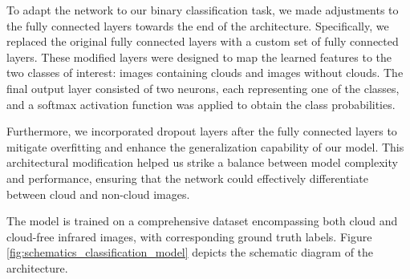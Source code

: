 \documentclass[amt, article]{copernicus}
\begin{document}
To adapt the network to our binary classification task, we made adjustments to the fully connected layers towards the end of the architecture. Specifically, we replaced the original fully connected layers with a custom set of fully connected layers. These modified layers were designed to map the learned features to the two classes of interest: images containing clouds and images without clouds. The final output layer consisted of two neurons, each representing one of the classes, and a softmax activation function was applied to obtain the class probabilities.

Furthermore, we incorporated dropout layers after the fully connected layers to mitigate overfitting and enhance the generalization capability of our model. This architectural modification helped us strike a balance between model complexity and performance, ensuring that the network could effectively differentiate between cloud and non-cloud images.

The model is trained on a comprehensive dataset encompassing both cloud and cloud-free infrared images, with corresponding ground truth labels.
Figure \ref{fig:schematics_classification_model} depicts the schematic diagram of the architecture.
\end{document}
